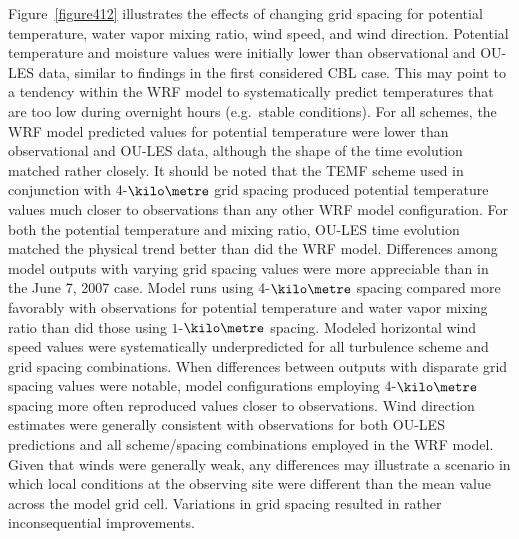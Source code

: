 Figure~\ref{figure412} illustrates the effects of changing grid spacing for potential temperature, water vapor mixing ratio, wind speed, and wind direction. Potential temperature and moisture values were initially lower than observational and OU-LES data, similar to findings in the first considered CBL case. This may point to a tendency within the WRF model to systematically predict temperatures that are too low during overnight hours (e.g.\ stable conditions). For all schemes, the WRF model predicted values for potential temperature were lower than observational and OU-LES data, although the shape of the time evolution matched rather closely. It should be noted that the TEMF scheme used in conjunction with $4$-$\kilo\metre$ grid spacing produced potential temperature values much closer to observations than any other WRF model configuration. For both the potential temperature and mixing ratio, OU-LES time evolution matched the physical trend better than did the WRF model. Differences among model outputs with varying grid spacing values were more appreciable than in the June 7, 2007 case. Model runs using $4$-$\kilo\metre$ spacing compared more favorably with observations for potential temperature and water vapor mixing ratio than did those using $1$-$\kilo\metre$ spacing. Modeled horizontal wind speed values were systematically underpredicted for all turbulence scheme and grid spacing combinations. When differences between outputs with disparate grid spacing values were notable, model configurations employing $4$-$\kilo\metre$ spacing more often reproduced values closer to observations. Wind direction estimates were generally consistent with observations for both OU-LES predictions and all scheme\slash spacing combinations employed in the WRF model. Given that winds were generally weak, any differences may illustrate a scenario in which local conditions at the observing site were different than the mean value across the model grid cell. Variations in grid spacing resulted in rather inconsequential improvements.


